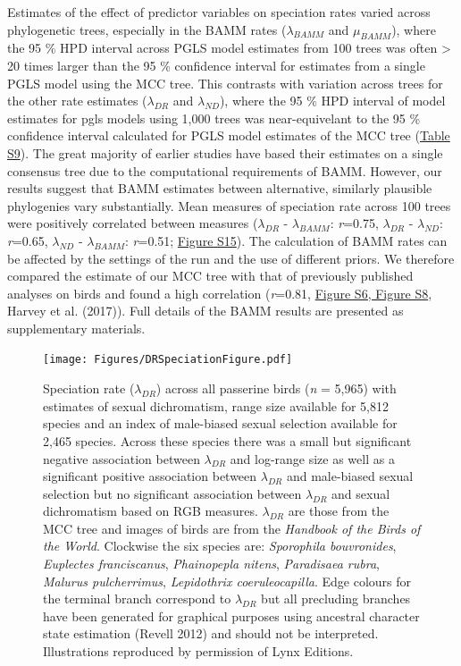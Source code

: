 \documentclass[]{article}
\begin{document}
Estimates of the effect of predictor variables on speciation rates
varied across phylogenetic trees, especially in the BAMM rates
(\(\lambda_{BAMM}\) and \(\mu_{BAMM}\)), where the 95 \% HPD interval
across PGLS model estimates from 100 trees was often \textgreater{} 20
times larger than the 95 \% confidence interval for estimates from a
single PGLS model using the MCC tree. This contrasts with variation
across trees for the other rate estimates (\(\lambda_{DR}\) and
\(\lambda_{ND}\)), where the 95 \% HPD interval of model estimates for
pgls models using 1,000 trees was near-equivelant to the 95 \%
confidence interval calculated for PGLS model estimates of the MCC tree
(\href{https://justincally.github.io/SexualSelection_Speciation/#pgls_models_on_bamm_estimates}{Table S9}).
The great majority of earlier studies have based their estimates on a
single consensus tree due to the computational requirements of BAMM.
However, our results suggest that BAMM estimates between alternative,
similarly plausible phylogenies vary substantially. Mean measures of
speciation rate across 100 trees were positively correlated between
measures (\(\lambda_{DR}\) - \(\lambda_{BAMM}\): \emph{r}=0.75,
\(\lambda_{DR}\) - \(\lambda_{ND}\): \emph{r}=0.65, \(\lambda_{ND}\) -
\(\lambda_{BAMM}\): \emph{r}=0.51;
\href{https://justincally.github.io/SexualSelection_Speciation/#additional_figures_and_tables}{Figure S15}).
The calculation of BAMM rates can be affected by the settings of the run
and the use of different priors. We therefore compared the estimate of
our MCC tree with that of previously published analyses on birds and
found a high correlation (\emph{r}=0.81,
\href{https://justincally.github.io/SexualSelection_Speciation/#bamm_measures_of_speciation_and_extinction}{Figure S6, Figure S8},
Harvey et al. (2017)). Full details of the BAMM results are presented as
supplementary materials.

\begin{figure}
\centering
\texttt{[image: Figures/DRSpeciationFigure.pdf]}
\caption{Speciation rate (\(\lambda_{DR}\)) across all passerine birds
(\emph{n} = 5,965) with estimates of sexual dichromatism, range size
available for 5,812 species and an index of male-biased sexual selection
available for 2,465 species. Across these species there was a small but
significant negative association between \(\lambda_{DR}\) and log-range
size as well as a significant positive association between
\(\lambda_{DR}\) and male-biased sexual selection but no significant
association between \(\lambda_{DR}\) and sexual dichromatism based on
RGB measures. \(\lambda_{DR}\) are those from the MCC tree and images of
birds are from the \emph{Handbook of the Birds of the World}. Clockwise
the six species are: \emph{Sporophila bouvronides}, \emph{Euplectes
franciscanus}, \emph{Phainopepla nitens}, \emph{Paradisaea rubra},
\emph{Malurus pulcherrimus}, \emph{Lepidothrix coeruleocapilla}. Edge
colours for the terminal branch correspond to \(\lambda_{DR}\) but all
precluding branches have been generated for graphical purposes using
ancestral character state estimation (Revell 2012) and should not be
interpreted. Illustrations reproduced by permission of Lynx Editions.
\label{Speciation_Figure}}
\end{figure}
\end{document}
